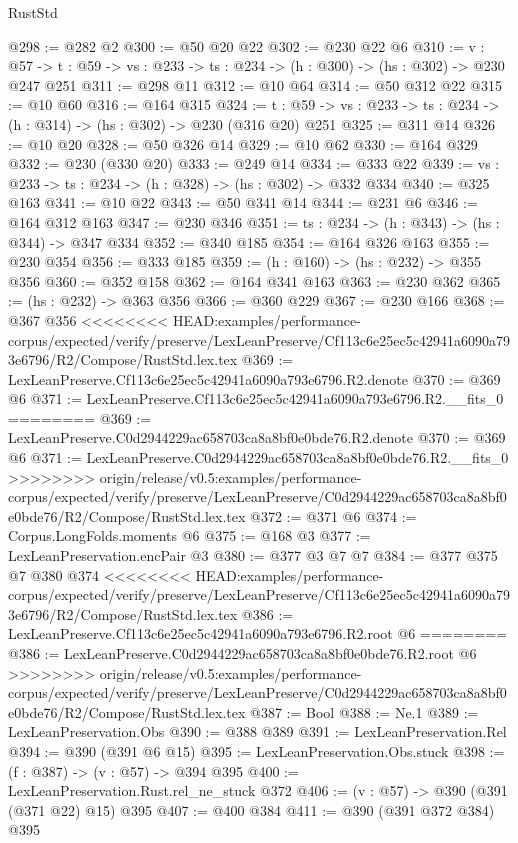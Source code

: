 \begin{lexlean}{RustStd}
\begin{coremodule}
{\begin{coremodule}
@298 := @282 @2
@300 := @50 @20 @22
@302 := @230 @22 @6
@310 := {v : @57} ->
  {t : @59} -> {vs : @233} -> {ts : @234} -> (h : @300) -> (hs : @302) -> @230 @247 @251
@311 := @298 @11
@312 := @10 @64
@314 := @50 @312 @22
@315 := @10 @60
@316 := @164 @315
@324 := {t : @59} -> {vs : @233} -> {ts : @234} -> (h : @314) -> (hs : @302) -> @230 (@316 @20) @251
@325 := @311 @14
@326 := @10 @20
@328 := @50 @326 @14
@329 := @10 @62
@330 := @164 @329
@332 := @230 (@330 @20)
@333 := @249 @14
@334 := @333 @22
@339 := {vs : @233} -> {ts : @234} -> (h : @328) -> (hs : @302) -> @332 @334
@340 := @325 @163
@341 := @10 @22
@343 := @50 @341 @14
@344 := @231 @6
@346 := @164 @312 @163
@347 := @230 @346
@351 := {ts : @234} -> (h : @343) -> (hs : @344) -> @347 @334
@352 := @340 @185
@354 := @164 @326 @163
@355 := @230 @354
@356 := @333 @185
@359 := (h : @160) -> (hs : @232) -> @355 @356
@360 := @352 @158
@362 := @164 @341 @163
@363 := @230 @362
@365 := (hs : @232) -> @363 @356
@366 := @360 @229
@367 := @230 @166
@368 := @367 @356
<<<<<<<< HEAD:examples/performance-corpus/expected/verify/preserve/LexLeanPreserve/Cf113c6e25ec5c42941a6090a793e6796/R2/Compose/RustStd.lex.tex
@369 := LexLeanPreserve.Cf113c6e25ec5c42941a6090a793e6796.R2.denote
@370 := @369 @6
@371 := LexLeanPreserve.Cf113c6e25ec5c42941a6090a793e6796.R2.__fits_0
========
@369 := LexLeanPreserve.C0d2944229ac658703ca8a8bf0e0bde76.R2.denote
@370 := @369 @6
@371 := LexLeanPreserve.C0d2944229ac658703ca8a8bf0e0bde76.R2.__fits_0
>>>>>>>> origin/release/v0.5:examples/performance-corpus/expected/verify/preserve/LexLeanPreserve/C0d2944229ac658703ca8a8bf0e0bde76/R2/Compose/RustStd.lex.tex
@372 := @371 @6
@374 := Corpus.LongFolds.moments @6
@375 := @168 @3
@377 := LexLeanPreservation.encPair @3
@380 := @377 @3 @7 @7
@384 := @377 @375 @7 @380 @374
<<<<<<<< HEAD:examples/performance-corpus/expected/verify/preserve/LexLeanPreserve/Cf113c6e25ec5c42941a6090a793e6796/R2/Compose/RustStd.lex.tex
@386 := LexLeanPreserve.Cf113c6e25ec5c42941a6090a793e6796.R2.root @6
========
@386 := LexLeanPreserve.C0d2944229ac658703ca8a8bf0e0bde76.R2.root @6
>>>>>>>> origin/release/v0.5:examples/performance-corpus/expected/verify/preserve/LexLeanPreserve/C0d2944229ac658703ca8a8bf0e0bde76/R2/Compose/RustStd.lex.tex
@387 := Bool
@388 := Ne.{1}
@389 := LexLeanPreservation.Obs
@390 := @388 @389
@391 := LexLeanPreservation.Rel
@394 := @390 (@391 @6 @15)
@395 := LexLeanPreservation.Obs.stuck
@398 := (f : @387) -> (v : @57) -> @394 @395
@400 := LexLeanPreservation.Rust.rel_ne_stuck @372
@406 := (v : @57) -> @390 (@391 (@371 @22) @15) @395
@407 := @400 @384
@411 := @390 (@391 @372 @384) @395

\end{coremodule}}
\end{coremodule}
\end{lexlean}
